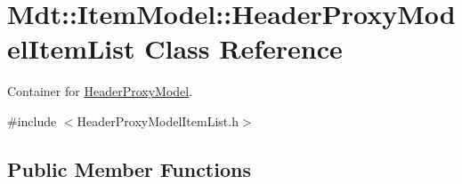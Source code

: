 \hypertarget{class_mdt_1_1_item_model_1_1_header_proxy_model_item_list}{}\section{Mdt\+:\+:Item\+Model\+:\+:Header\+Proxy\+Model\+Item\+List Class Reference}
\label{class_mdt_1_1_item_model_1_1_header_proxy_model_item_list}


Container for \hyperlink{class_mdt_1_1_item_model_1_1_header_proxy_model}{Header\+Proxy\+Model}.  




{\ttfamily \#include $<$Header\+Proxy\+Model\+Item\+List.\+h$>$}

\subsection*{Public Member Functions}

